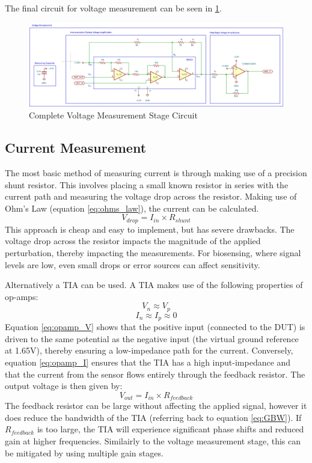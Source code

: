 The final circuit for voltage measurement can be seen in \ref{fig:vmeas_stage_circuit}.

\begin{figure}[H]
    \centering
    \includegraphics[width=\textwidth]{VMeasSchem.png}
    \caption{Complete Voltage Measurement Stage Circuit}
    \label{fig:vmeas_stage_circuit}
\end{figure}

\subsection{Current Measurement}\label{subsec:design_cur}
The most basic method of measuring current is through making use of a precision shunt resistor. This involves placing a small known resistor in series with the current path and measuring the voltage drop across the resistor. Making use of Ohm's Law (equation \ref{eq:ohms_law}), the current can be calculated.
\begin{equation}
    V_{drop} = I_{in} \times R_{shunt}
    \label{eq:ohms_law}
\end{equation}
This approach is cheap and easy to implement, but has severe drawbacks. The voltage drop across the resistor impacts the magnitude of the applied perturbation, thereby impacting the measurements. For biosensing, where signal levels are low, even small drops or error sources can affect sensitivity.

Alternatively a \ac{TIA} can be used. A \ac{TIA} makes use of the following properties of op-amps:
\begin{equation}
    V_n \approx V_p
    \label{eq:opamp_V}
\end{equation}
\begin{equation}
    I_n \approx I_p \approx 0
    \label{eq:opamp_I}
\end{equation}
Equation \ref{eq:opamp_V} shows that the positive input (connected to the \ac{DUT}) is driven to the same potential as the negative input (the virtual ground reference at 1.65V), thereby ensuring a low-impedance path for the current. Conversely, equation \ref{eq:opamp_I} ensures that the TIA has a high input-impedance and that the current from the sensor flows entirely through the feedback resistor. The output voltage is then given by:
\begin{equation}
    V_{out}=I_{in} \times R_{feedback}
    \label{eq:tia_gain}
\end{equation}
The feedback resistor can be large without affecting the applied signal, however it does reduce the bandwidth of the TIA (referring back to equation \ref{eq:GBW}). If $R_{feedback}$ is too large, the TIA will experience significant phase shifts and reduced gain at higher frequencies. Similairly to the voltage measurement stage, this can be mitigated by using multiple gain stages.

